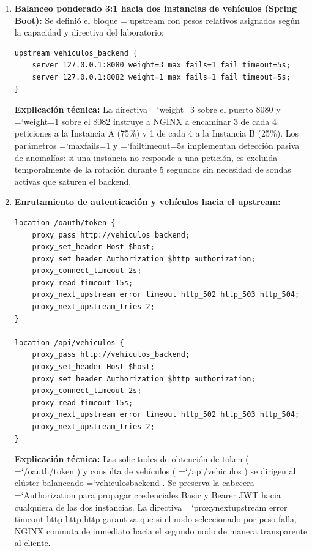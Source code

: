 \documentclass[11pt,a4paper]{article}
\renewcommand{\_}{\oldunderscore\allowbreak}
\DeclareRobustCommand{\texttt}[1]{%
  {\upshape\ttfamily\fontsize{9}{10.8}\selectfont\hyphenchar\font=`\-\relax #1}%
}
\begin{document}
\begin{enumerate}[leftmargin=*,itemsep=4pt,topsep=2pt]
  \item \textbf{Balanceo ponderado 3:1 hacia dos instancias de vehículos (Spring Boot):}
  Se definió el bloque \texttt{upstream} con pesos relativos asignados según la capacidad y directiva del laboratorio:
\begin{lstlisting}
upstream vehiculos_backend {
    server 127.0.0.1:8080 weight=3 max_fails=1 fail_timeout=5s;
    server 127.0.0.1:8082 weight=1 max_fails=1 fail_timeout=5s;
}
\end{lstlisting}
  \textbf{Explicación técnica:} La directiva \texttt{weight=3} sobre el puerto 8080 y \texttt{weight=1} sobre el 8082 instruye a NGINX a encaminar 3 de cada 4 peticiones a la Instancia A (75\%) y 1 de cada 4 a la Instancia B (25\%). Los parámetros \texttt{max\_fails=\allowbreak{}1} y \texttt{fail\_timeout=\allowbreak{}5s} implementan detección pasiva de anomalías: si una instancia no responde a una petición, es excluida temporalmente de la rotación durante 5 segundos sin necesidad de sondas activas que saturen el backend.

  \item \textbf{Enrutamiento de autenticación y vehículos hacia el upstream:}
\begin{lstlisting}
location /oauth/token {
    proxy_pass http://vehiculos_backend;
    proxy_set_header Host $host;
    proxy_set_header Authorization $http_authorization;
    proxy_connect_timeout 2s;
    proxy_read_timeout 15s;
    proxy_next_upstream error timeout http_502 http_503 http_504;
    proxy_next_upstream_tries 2;
}

location /api/vehiculos {
    proxy_pass http://vehiculos_backend;
    proxy_set_header Host $host;
    proxy_set_header Authorization $http_authorization;
    proxy_connect_timeout 2s;
    proxy_read_timeout 15s;
    proxy_next_upstream error timeout http_502 http_503 http_504;
    proxy_next_upstream_tries 2;
}
\end{lstlisting}
  \textbf{Explicación técnica:} Las solicitudes de obtención de token (\texttt{/\allowbreak{}oauth/\allowbreak{}token}) y consulta de vehículos (\texttt{/\allowbreak{}api/\allowbreak{}vehiculos}) se dirigen al clúster balanceado \texttt{vehiculos\_backend}. Se preserva la cabecera \texttt{Authorization} para propagar credenciales Basic y Bearer JWT hacia cualquiera de las dos instancias. La directiva \texttt{proxy\_next\_upstream error timeout http\_502 http\_503 http\_504} garantiza que si el nodo seleccionado por peso falla, NGINX conmuta de inmediato hacia el segundo nodo de manera transparente al cliente.


\end{enumerate}
\end{document}
